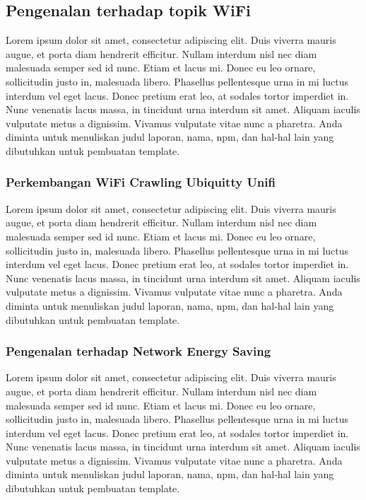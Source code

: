   \subsection{Pengenalan terhadap topik WiFi}

  Lorem ipsum dolor sit amet, consectetur adipiscing elit. Duis viverra mauris 
  augue, et porta diam hendrerit efficitur. Nullam interdum nisl nec diam 
  malesuada semper sed id nunc. Etiam et lacus mi. Donec eu leo ornare, 
  sollicitudin justo in, malesuada libero. Phasellus pellentesque urna in mi luctus 
  interdum vel eget lacus. Donec pretium erat leo, at sodales tortor imperdiet in. 
  Nunc venenatis lacus massa, in tincidunt urna interdum sit amet. Aliquam iaculis 
  vulputate metus a dignissim. Vivamus vulputate vitae nunc a pharetra.
  Anda diminta untuk menuliskan judul laporan, nama, npm, dan hal-hal lain yang 
  dibutuhkan untuk pembuatan template. 

    \subsubsection{Perkembangan WiFi Crawling Ubiquitty Unifi}

    Lorem ipsum dolor sit amet, consectetur adipiscing elit. Duis viverra mauris 
    augue, et porta diam hendrerit efficitur. Nullam interdum nisl nec diam 
    malesuada semper sed id nunc. Etiam et lacus mi. Donec eu leo ornare, 
    sollicitudin justo in, malesuada libero. Phasellus pellentesque urna in mi luctus 
    interdum vel eget lacus. Donec pretium erat leo, at sodales tortor imperdiet in. 
    Nunc venenatis lacus massa, in tincidunt urna interdum sit amet. Aliquam iaculis 
    vulputate metus a dignissim. Vivamus vulputate vitae nunc a pharetra.
    Anda diminta untuk menuliskan judul laporan, nama, npm, dan hal-hal lain yang 
    dibutuhkan untuk pembuatan template. 

    \subsubsection{Pengenalan terhadap Network Energy Saving}

    Lorem ipsum dolor sit amet, consectetur adipiscing elit. Duis viverra mauris 
    augue, et porta diam hendrerit efficitur. Nullam interdum nisl nec diam 
    malesuada semper sed id nunc. Etiam et lacus mi. Donec eu leo ornare, 
    sollicitudin justo in, malesuada libero. Phasellus pellentesque urna in mi luctus 
    interdum vel eget lacus. Donec pretium erat leo, at sodales tortor imperdiet in. 
    Nunc venenatis lacus massa, in tincidunt urna interdum sit amet. Aliquam iaculis 
    vulputate metus a dignissim. Vivamus vulputate vitae nunc a pharetra.
    Anda diminta untuk menuliskan judul laporan, nama, npm, dan hal-hal lain yang 
    dibutuhkan untuk pembuatan template. 

